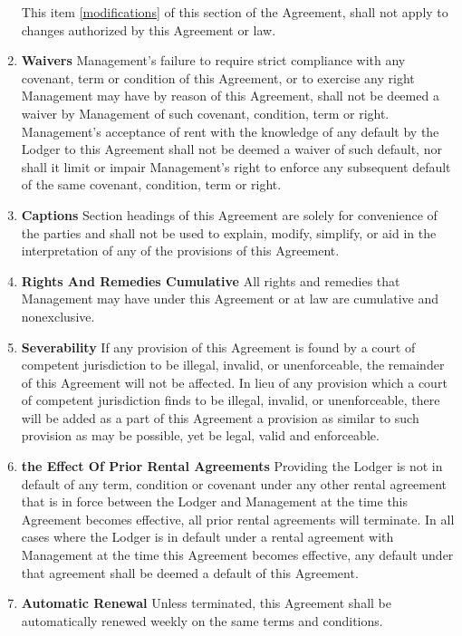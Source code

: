 \documentclass[12pt,letterpaper]{article}
\newcommand{\lodger}{Lodger}
\newcommand{\management}{Management}
\begin{document}
\begin{enumerate}
		This item \ref{modifications} of this section of the Agreement, shall not apply to changes authorized by this Agreement or law.
	\item \textbf{Waivers} \quad 
		\management{}'s failure to require strict compliance with any covenant, term or condition of this Agreement, or to exercise any right \management{} may have by reason of this Agreement, shall not be deemed a waiver by \management{} of such covenant, condition, term or right. \management{}'s acceptance of rent with the knowledge of any default by the \lodger{} to this Agreement shall not be deemed a waiver of such default, nor shall it limit or impair \management{}'s right to enforce any subsequent default of the same covenant, condition, term or right. 
	\item \textbf{Captions} \quad 
		Section headings of this Agreement are solely for convenience of the parties and shall not be used to explain, modify, simplify, or aid in the interpretation of any of the provisions of this Agreement. 
	\item \textbf{Rights And Remedies Cumulative} \quad 
		All rights and remedies that \management{} may have under this Agreement or at law are cumulative and nonexclusive. 
	\item \textbf{Severability} \quad 
		If any provision of this Agreement is found by a court of competent jurisdiction to be illegal, invalid, or unenforceable, the remainder of this Agreement will not be affected. In lieu of any provision which a court of competent jurisdiction finds to be illegal, invalid, or unenforceable, there will be added as a part of this Agreement a provision as similar to such provision as may be possible, yet be legal, valid and enforceable. 
	\item \textbf{the Effect Of Prior Rental Agreements} \quad 
		Providing the \lodger{} is not in default of any term, condition or covenant under any other rental agreement that is in force between the \lodger{} and \management{} at the time this Agreement becomes effective, all prior rental agreements will terminate. In all cases where the \lodger{} is in default under a rental agreement with \management{} at the time this Agreement becomes effective, any default under that agreement shall be deemed a default of this Agreement. 
	\item \textbf{Automatic Renewal} \quad 
		Unless terminated, this Agreement shall be automatically renewed weekly on the same terms and conditions. 
\end{enumerate}
\end{document}
